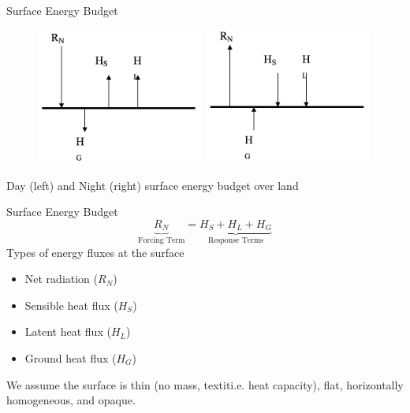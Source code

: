 \begin{frame}{Surface Energy Budget}
\begin{figure}
	\includegraphics[width=0.49\textwidth]{rad6.png}
	\includegraphics[width=0.49\textwidth]{rad7.png}
\end{figure}
Day (left) and Night (right) surface energy budget over land
\end{frame}

\begin{frame}{Surface Energy Budget}
$$\underbrace{R_N}_{\text{Forcing Term}} = \underbrace{H_S + H_L + H_G}_{\text{Response Terms}}$$
Types of energy fluxes at the surface
\begin{itemize}
	\item Net radiation ($R_N$)
	\item Sensible heat flux ($H_S$)
	\item Latent heat flux ($H_L$)
	\item Ground heat flux ($H_G$)
\end{itemize}
We assume the surface is thin (no mass, textit{i.e.} heat capacity), flat, horizontally homogeneous, and opaque.
\end{frame}

